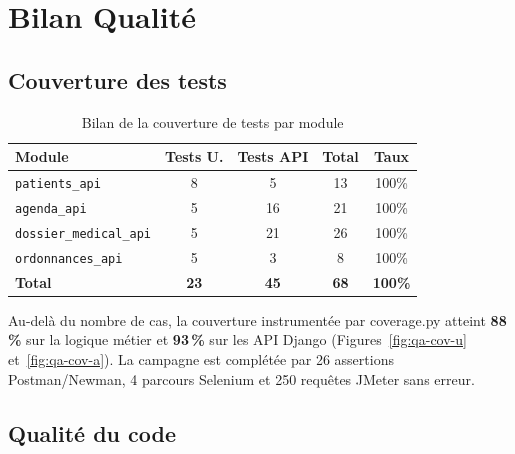 \documentclass[12pt,a4paper]{report}
\begin{document}
\chapter{Bilan Qualité}

\section{Couverture des tests}

\begin{table}[H]
\centering
\caption{Bilan de la couverture de tests par module}
\renewcommand{\arraystretch}{1.4}
\begin{tabular}{|p{4cm}|c|c|c|c|}
  \hline
  \rowcolor{medaccent}
  \textbf{Module} & \textbf{Tests U.} & \textbf{Tests API} & \textbf{Total} & \textbf{Taux} \\
  \hline
  \texttt{patients\_api} & 8 & 5 & 13 & \textcolor{medgreen}{100\%} \\
  \hline
  \texttt{agenda\_api} & 5 & 16 & 21 & \textcolor{medgreen}{100\%} \\
  \hline
  \texttt{dossier\_medical\_api} & 5 & 21 & 26 & \textcolor{medgreen}{100\%} \\
  \hline
  \texttt{ordonnances\_api} & 5 & 3 & 8 & \textcolor{medgreen}{100\%} \\
  \hline
  \rowcolor{medgreen!20}
  \textbf{Total} & \textbf{23} & \textbf{45} & \textbf{68} & \textcolor{medgreen}{\textbf{100\%}} \\
  \hline
\end{tabular}
\end{table}

Au-delà du nombre de cas, la couverture instrumentée par coverage.py atteint \textbf{88\,\%} sur la logique métier et \textbf{93\,\%} sur les API Django (Figures~\ref{fig:qa-cov-u} et~\ref{fig:qa-cov-a}). La campagne est complétée par 26 assertions Postman/Newman, 4 parcours Selenium et 250 requêtes JMeter sans erreur.

\section{Qualité du code}
\end{document}
